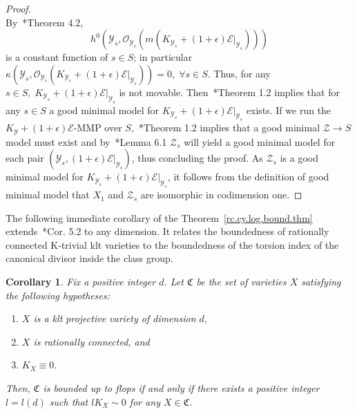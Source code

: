 \documentclass[11pt]{ip-journal}
\newtheorem{corollary}[theorem]{Corollary}
\theoremstyle{definition}
\begin{document}
\begin{proof}
\[\]
By~\cite{MR3779687}*{Theorem 4.2}, 
\[ 
h^0(\mathcal{Y}_s, \mathcal{O}_{\mathcal{Y}_s}(m(K_{\mathcal{Y}_s} +(1+\epsilon) \mathcal{E}|_{\mathcal{Y}_s})))
\] 
is a constant function of $s \in S$; 
in particular $\kappa(\mathcal{Y}_s, \mathcal{O}_{\mathcal{Y}_s}(K_{\mathcal{Y}_s} +(1+\epsilon) \mathcal{E}|_{\mathcal{Y}_s})) = 0, \; \forall s\in S$.
Thus, for any $s \in S, \; K_{\mathcal{Y}_s} +(1+\epsilon) \mathcal{E}|_{\mathcal{Y}_s}$ is not movable.
Then~\cite{MR3779687}*{Theorem 1.2} implies that for any $s \in S$ a good minimal model for $K_{\mathcal{Y}_s} +(1+\epsilon) \mathcal{E}|_{\mathcal{Y}_s}$ exists.
If we run the $K_{\mathcal{Y}} +(1+\epsilon)\mathcal{E}$-MMP over $S$,~\cite{MR3779687}*{Theorem 1.2} implies that a good minimal $\mathcal{Z} \to S$ model must exist and by~\cite{MR3779687}*{Lemma 6.1} $\mathcal{Z}_s$ will yield a good minimal model for each pair $(\mathcal{Y}_s, (1+\epsilon) \mathcal{E}|_{\mathcal{Y}_s})$, thus concluding the proof.
As $\mathcal{Z}_s$ is a good minimal model for $K_{\mathcal{Y}_s} + (1+\epsilon) \mathcal{E}|_{\mathcal{Y}_s}$, it follows from the definition of good minimal model that $X_1$ and $\mathcal{Z}_s$ are isomorphic in codimension one.
\end{proof}

The following immediate corollary of the Theorem~\ref{rc.cy.log.bound.thm} extends~\cite{CDHJS}*{Cor. 5.2} to any dimension. 
It relates the boundedness of rationally connected K-trivial klt varieties to the boundedness of the torsion index of the canonical divisor inside the class group.

\begin{corollary}
\label{equiv.rc.cy.bound.cor}
Fix a positive integer $d$.
Let $\mathfrak{C}$ be the set of varieties $X$ satisfying the following hypotheses:
\begin{enumerate}
    \item $X$ is a klt projective variety of dimension $d$, 
    \item $X$ is rationally connected, and
    \item $K_X \equiv 0$.
\end{enumerate}
Then, $\mathfrak{C}$ is bounded up to flops if and only if there exists a positive integer $l=l(d)$ such that $lK_X \sim 0$ for any $X \in \mathfrak{C}$.
\end{corollary}
\end{document}
